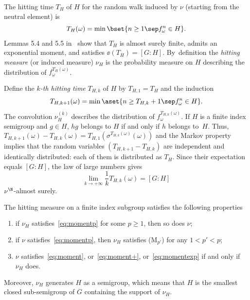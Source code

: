 The hitting time $T_{H}$ of $H$ for the random walk
induced by $\nu$ (starting from the neutral element) is
\begin{equation*}
T_H(\omega) = \min\bset {n\geq 1\sep f^n_\omega \in H}.
\end{equation*}
Lemmas 5.4 and 5.5 in~\cite{benoist-quint_book} show that $T_H$ is almost surely finite,
admits an exponential moment, and satisfies $\ee(T_{H}) = [G:H]$. By~definition the \emph{hitting measure} (or induced measure)
$\nu_H$ is the probability measure on $H$ describing the distribution of $f^{T_{H}(\omega)}_\omega$.

Define the \emph{$k$-th hitting time} $T_{H,k}$ of $H$ by $T_{H,1}=T_H$ and the induction\vspace*{-3pt}
\begin{equation*}
T_{H,k+1}(\omega) = \min\aset{n\geq T_{H,k}+1\sep  f_\omega^{n} \in H}.
\end{equation*}
The convolution $\nu_H^{(k)}$ describes the distribution
of $f^{T_{H,k}(\omega)}_\omega$.
If $H$ is a finite index semigroup and $g\in H$, $hg$ belongs to $H$ if and only if $h$ belongs to~$H$. Thus,
$T_{H, k+1}(\omega) - T_{H, k}(\omega) = T_{H, 1}(\sigma^{T_{H, k}(\omega)}(\omega))$ and the Markov property implies that the random variables $(T_{H, k+1} - T_{H, k})$ are independent and identically distributed: each of them is distributed as $T_H$. Since their expectation equals $[G:H]$,
the law of large numbers gives\vspace*{-3pt}\enlargethispage{.6\baselineskip}
\begin{equation*}\label{eq:limit_kth_hitting_time}
\lim_{k\to+\infty} \frac{1}{k}T_{H, k}(\omega)=[G:H]
\end{equation*} $\nu^\N$-almost surely.

\begin{thm}\label{thm:M$_2$} The hitting measure on a finite index subgroup satisfies the following properties
\begin{enumerate}
\item\label{thm:M$_2$1} if $\nu_H$ satisfies~\eqref{eq:momentp} for some $p\geq 1$, then so does $\nu$;
\item\label{thm:M$_2$2} if $\nu$ satisfies~\eqref{eq:momentp}, then $\nu_H$ satisfies (M$_{p'}$) for any $1 < p' < p$;
\item\label{thm:M$_2$3} $\nu$ satisfies~\eqref{eq:moment}, or~\eqref{eq:moment+}, or~\eqref{eq:momentexp} if and only if $\nu_H$ does.
\end{enumerate}
Moreover, $\nu_H$ generates $H$ as a semigroup, which means that $H$ is the smallest closed sub-semigroup of $G$ containing the support of $\nu_H$.
\end{thm}

